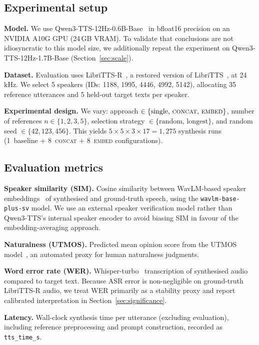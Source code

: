 \documentclass{Interspeech}
\begin{document}
\subsection{Experimental setup}
\label{sec:setup}

\textbf{Model.}
We use Qwen3-TTS-12Hz-0.6B-Base~\cite{qwen3tts} in bfloat16 precision on an NVIDIA A10G GPU (24\,GB VRAM).
To validate that conclusions are not idiosyncratic to this model size, we additionally repeat the experiment on Qwen3-TTS-12Hz-1.7B-Base (Section~\ref{sec:scale}).

\textbf{Dataset.}
Evaluation uses LibriTTS-R~\cite{libritts_r}, a restored version of LibriTTS~\cite{libritts}, at 24\,kHz.
We select 5 speakers (IDs: 1188, 1995, 4446, 4992, 5142), allocating 35 reference utterances and 5 held-out target texts per speaker.

\textbf{Experimental design.}
We vary: approach $\in \{\text{single, \textsc{concat}, \textsc{embed}}\}$, number of references $n \in \{1,2,3,5\}$, selection strategy $\in \{\text{random, longest}\}$, and random seed $\in \{42, 123, 456\}$.
This yields $5 \times 5 \times 3 \times 17 = 1{,}275$ synthesis runs (1~baseline + 8~\textsc{concat} + 8~\textsc{embed} configurations).

\subsection{Evaluation metrics}
\label{sec:metrics}

\textbf{Speaker similarity (SIM).}
Cosine similarity between WavLM-based speaker embeddings~\cite{wavlm} of synthesised and ground-truth speech, using the \texttt{wavlm-base-plus-sv} model.
We use an external speaker verification model rather than Qwen3-TTS's internal speaker encoder to avoid biasing SIM in favour of the embedding-averaging approach.

\textbf{Naturalness (UTMOS).}
Predicted mean opinion score from the UTMOS model~\cite{utmos}, an automated proxy for human naturalness judgments.

\textbf{Word error rate (WER).}
Whisper-turbo~\cite{whisper} transcription of synthesised audio compared to target text.
Because ASR error is non-negligible on ground-truth LibriTTS-R audio, we treat WER primarily as a stability proxy and report calibrated interpretation in Section~\ref{sec:significance}.

\textbf{Latency.}
Wall-clock synthesis time per utterance (excluding evaluation), including reference preprocessing and prompt construction, recorded as \texttt{tts\_time\_s}.
\end{document}
